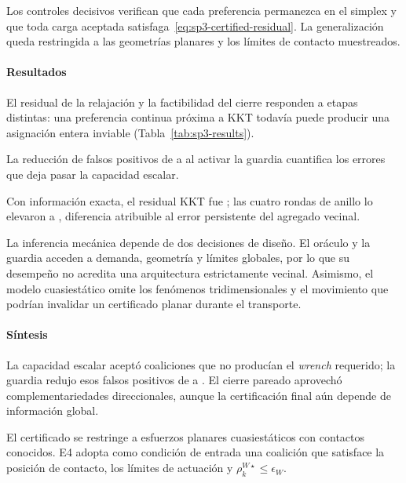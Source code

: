 Los controles decisivos verifican que cada preferencia permanezca en el simplex y que toda carga aceptada satisfaga~\eqref{eq:sp3-certified-residual}. La generalización queda restringida a las geometrías planares y los límites de contacto muestreados.

\paragraph{Resultados}

El residual de la relajación y la factibilidad del cierre responden a etapas distintas: una preferencia continua próxima a KKT todavía puede producir una asignación entera inviable (Tabla~\ref{tab:sp3-results}).

\begin{table}[!htbp]
  \centering
  \caption[E3 sobre 600 mundos pareados. Brecha y residual KKT adimensionales.]{E3 sobre \SPThreeWorlds{} mundos pareados. Brecha y residual KKT adimensionales.}
  \label{tab:sp3-results}
  \resizebox{\textwidth}{!}{}
  \viuownsource
\end{table}


\begin{samepage}
La reducción de falsos positivos de \SPThreeUnguardedFP{} a \SPThreeGuardedFP{} al activar la guardia cuantifica los errores que deja pasar la capacidad escalar.

Con información exacta, el residual KKT fue \SPThreeExactKKT{}; las cuatro rondas de anillo lo elevaron a \SPThreeRingKKT{}, diferencia atribuible al error persistente del agregado vecinal.
\end{samepage}

La inferencia mecánica depende de dos decisiones de diseño. El oráculo y la guardia acceden a demanda, geometría y límites globales, por lo que su desempeño no acredita una arquitectura estrictamente vecinal. Asimismo, el modelo cuasiestático omite los fenómenos tridimensionales y el movimiento que podrían invalidar un certificado planar durante el transporte.

\paragraph{Síntesis}

La capacidad escalar aceptó coaliciones que no producían el \emph{wrench} requerido; la guardia redujo esos falsos positivos de \SPThreeUnguardedFP{} a \SPThreeGuardedFP{}. El cierre pareado aprovechó complementariedades direccionales, aunque la certificación final aún depende de información global.

El certificado se restringe a esfuerzos planares cuasiestáticos con contactos conocidos. E4 adopta como condición de entrada una coalición que satisface la posición de contacto, los límites de actuación y $\rho_k^{W\star}\leq\epsilon_W$.
